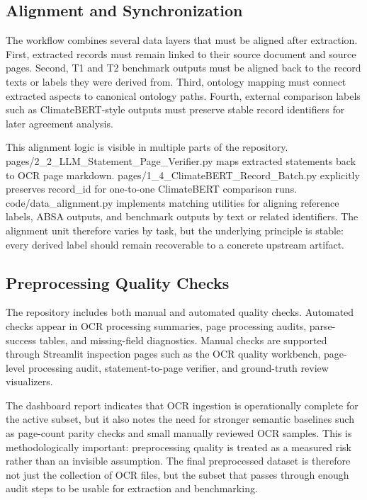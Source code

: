 \documentclass[english, online, cse, master]{dithesis}
\begin{document}
\subsection{Alignment and Synchronization}

The workflow combines several data layers that must be aligned after extraction. First, extracted records must remain linked to their source document and source pages. Second, T1 and T2 benchmark outputs must be aligned back to the record texts or labels they were derived from. Third, ontology mapping must connect extracted aspects to canonical ontology paths. Fourth, external comparison labels such as ClimateBERT-style outputs must preserve stable record identifiers for later agreement analysis.

This alignment logic is visible in multiple parts of the repository. pages/2\_2\_LLM\_Statement\_Page\_Verifier.py maps extracted statements back to OCR page markdown. pages/1\_4\_ClimateBERT\_Record\_Batch.py explicitly preserves record\_id for one-to-one ClimateBERT comparison runs. code/data\_alignment.py implements matching utilities for aligning reference labels, ABSA outputs, and benchmark outputs by text or related identifiers. The alignment unit therefore varies by task, but the underlying principle is stable: every derived label should remain recoverable to a concrete upstream artifact.

\subsection{Preprocessing Quality Checks}

The repository includes both manual and automated quality checks. Automated checks appear in OCR processing summaries, page processing audits, parse-success tables, and missing-field diagnostics. Manual checks are supported through Streamlit inspection pages such as the OCR quality workbench, page-level processing audit, statement-to-page verifier, and ground-truth review visualizers.

The dashboard report indicates that OCR ingestion is operationally complete for the active subset, but it also notes the need for stronger semantic baselines such as page-count parity checks and small manually reviewed OCR samples. This is methodologically important: preprocessing quality is treated as a measured risk rather than an invisible assumption. The final preprocessed dataset is therefore not just the collection of OCR files, but the subset that passes through enough audit steps to be usable for extraction and benchmarking.
\end{document}
